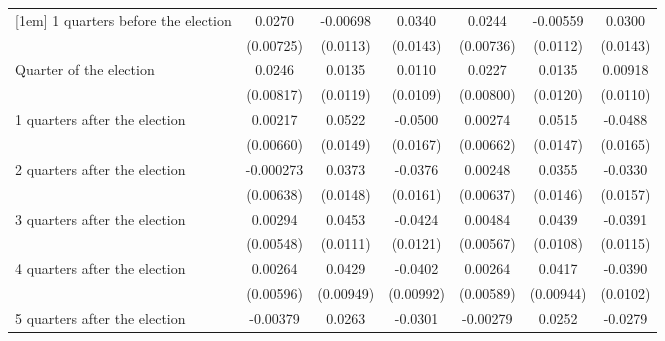 \begin{table}[!ht]
\begin{tabular}{l*{6}{c}}
[1em]
 1 quarters before the election&      0.0270\sym{***}&    -0.00698         &      0.0340\sym{*}  &      0.0244\sym{***}&    -0.00559         &      0.0300\sym{*}  \\
                    &   (0.00725)         &    (0.0113)         &    (0.0143)         &   (0.00736)         &    (0.0112)         &    (0.0143)         \\
[1em]
Quarter of the election&      0.0246\sym{**} &      0.0135         &      0.0110         &      0.0227\sym{**} &      0.0135         &     0.00918         \\
                    &   (0.00817)         &    (0.0119)         &    (0.0109)         &   (0.00800)         &    (0.0120)         &    (0.0110)         \\
[1em]
 1 quarters after the election&     0.00217         &      0.0522\sym{***}&     -0.0500\sym{**} &     0.00274         &      0.0515\sym{***}&     -0.0488\sym{**} \\
                    &   (0.00660)         &    (0.0149)         &    (0.0167)         &   (0.00662)         &    (0.0147)         &    (0.0165)         \\
[1em]
 2 quarters after the election&   -0.000273         &      0.0373\sym{*}  &     -0.0376\sym{*}  &     0.00248         &      0.0355\sym{*}  &     -0.0330\sym{*}  \\
                    &   (0.00638)         &    (0.0148)         &    (0.0161)         &   (0.00637)         &    (0.0146)         &    (0.0157)         \\
[1em]
 3 quarters after the election&     0.00294         &      0.0453\sym{***}&     -0.0424\sym{***}&     0.00484         &      0.0439\sym{***}&     -0.0391\sym{***}\\
                    &   (0.00548)         &    (0.0111)         &    (0.0121)         &   (0.00567)         &    (0.0108)         &    (0.0115)         \\
[1em]
 4 quarters after the election&     0.00264         &      0.0429\sym{***}&     -0.0402\sym{***}&     0.00264         &      0.0417\sym{***}&     -0.0390\sym{***}\\
                    &   (0.00596)         &   (0.00949)         &   (0.00992)         &   (0.00589)         &   (0.00944)         &    (0.0102)         \\
[1em]
 5 quarters after the election&    -0.00379         &      0.0263\sym{*}  &     -0.0301\sym{**} &    -0.00279         &      0.0252\sym{*}  &     -0.0279\sym{**} \\

\end{tabular}
\end{table}
